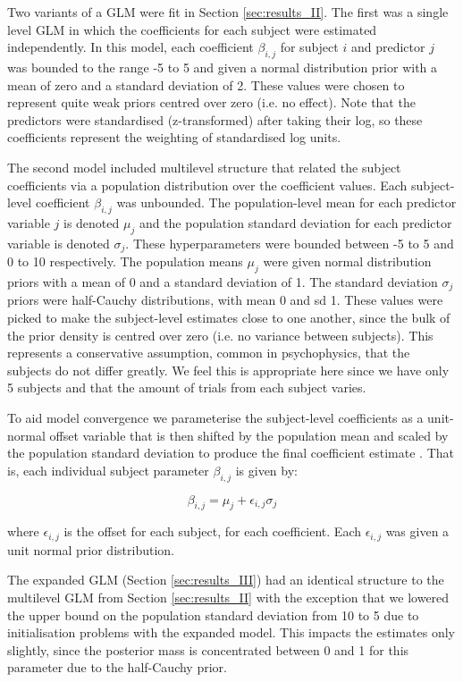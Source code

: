 \documentclass[11pt,a4paper]{article}
\begin{document}
{Two variants of a GLM were fit in Section \ref{sec:results_II}.
The first was a single level GLM in which the coefficients for each subject were estimated independently.
In this model, each coefficient $\beta_{i,j}$ for subject $i$ and predictor $j$ was bounded to the range -5 to 5 and given a normal distribution prior with a mean of zero and a standard deviation of 2.
These values were chosen to represent quite weak priors centred over zero (i.e. no effect).
Note that the predictors were standardised (z-transformed) after taking their log, so these coefficients represent the weighting of standardised log units.

The second model included multilevel structure that related the subject coefficients via a population distribution over the coefficient values.
Each subject-level coefficient $\beta_{i,j}$ was unbounded.
The population-level mean for each predictor variable $j$ is denoted $\mu_{j}$ and the population standard deviation for each predictor variable is denoted $\sigma_{j}$.
These hyperparameters were bounded between -5 to 5 and 0 to 10 respectively.
The population means $\mu_j$ were given normal distribution priors with a mean of 0 and a standard deviation of 1.
The standard deviation $\sigma_j$ priors were half-Cauchy distributions, with mean 0 and sd 1.
These values were picked to make the subject-level estimates close to one another, since the bulk of the prior density is centred over zero (i.e. no variance between subjects).
This represents a conservative assumption, common in psychophysics, that the subjects do not differ greatly.
We feel this is appropriate here since we have only 5 subjects and that the amount of trials from each subject varies.

To aid model convergence we parameterise the subject-level coefficients as a unit-normal offset variable that is then shifted by the population mean and scaled by the population standard deviation to produce the final coefficient estimate \citep{Papaspiliopoulos2007,StanDevelopmentTeam2014}.
That is, each individual subject parameter $\beta_{i,j}$ is given by:

\begin{equation}
\beta_{i,j} = \mu_{j} + \epsilon_{i,j} \sigma_{j}
\end{equation}

where $\epsilon_{i,j}$ is the offset for each subject, for each coefficient.
Each $\epsilon_{i,j}$ was given a unit normal prior distribution.

The expanded GLM (Section \ref{sec:results_III}) had an identical structure to the multilevel GLM from Section \ref{sec:results_II} with the exception that we lowered the upper bound on the population standard deviation from 10 to 5 due to initialisation problems with the expanded model.
This impacts the estimates only slightly, since the posterior mass is concentrated between 0 and 1 for this parameter due to the half-Cauchy prior.

}
\end{document}
